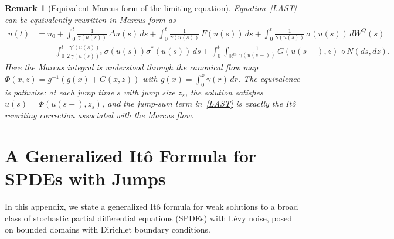 \documentclass[11pt]{article}
\theoremstyle{plain}
\newtheorem{remark}[theorem]{Remark}
\numberwithin{equation}{section}
\begin{document}
 
\begin{remark}[Equivalent Marcus form of the limiting equation]\label{rem:LAST-marcus}
Equation~\eqref{LAST} can be equivalently rewritten in Marcus form as
\begin{equation}\label{eq:LAST-Marcus}
\begin{aligned}
u(t) &= u_0
+ \int_0^t \frac{1}{\gamma(u(s))}\,\Delta u(s)\,ds
+ \int_0^t \frac{1}{\gamma(u(s))}\,F(u(s))\,ds
+ \int_0^t \frac{1}{\gamma(u(s))}\,\sigma(u(s))\,dW^Q(s) \\
&\quad
-\int_0^t \frac{\gamma'(u(s))}{2\,\gamma(u(s))^3}\,
\sigma(u(s))\sigma^\ast(u(s))\,ds
+ \int_0^t\!\!\int_{\mathbb R^m}
\frac{1}{\gamma(u(s-))}\,G(u(s-),z)\,\diamond N(ds,dz).
\end{aligned}
\end{equation}
Here the Marcus integral is understood through the canonical flow map
$\Phi(x,z)=g^{-1}(g(x)+G(x,z))$ with $g(x)=\int_0^x\gamma(r)\,dr$.
The equivalence is pathwise: at each jump time $s$ with jump size $z_s$, the solution satisfies
$u(s)=\Phi(u(s-),z_s)$, and the jump-sum term in~\eqref{LAST} is exactly the It\^o rewriting
correction associated with the Marcus flow.
\end{remark}
 
 
 


 

 

 
 
 
 
\appendix

\section{ A Generalized It\^o  Formula for SPDEs with Jumps}

In this appendix, we state a generalized It\^o  formula for weak solutions to a broad class of stochastic partial differential equations (SPDEs) with Lévy noise, posed on bounded domains with Dirichlet boundary conditions.
\end{document}
